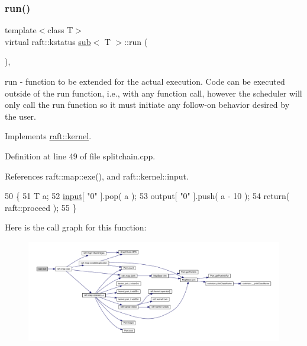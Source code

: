 \subsubsection{\texorpdfstring{run()}{run()}\hspace{0.1cm}{\footnotesize\ttfamily [10/12]}}
{\footnotesize\ttfamily template$<$class T$>$ \\
virtual raft\+::kstatus \hyperlink{classsub}{sub}$<$ T $>$\+::run (\begin{DoxyParamCaption}{ }\end{DoxyParamCaption})\hspace{0.3cm}{\ttfamily [inline]}, {\ttfamily [virtual]}}

run -\/ function to be extended for the actual execution. Code can be executed outside of the run function, i.\+e., with any function call, however the scheduler will only call the run function so it must initiate any follow-\/on behavior desired by the user. 

Implements \hyperlink{classraft_1_1kernel_a05094286d7577360fb1b91c91fc05901}{raft\+::kernel}.



Definition at line 49 of file splitchain.\+cpp.



References raft\+::map\+::exe(), and raft\+::kernel\+::input.


\begin{DoxyCode}
50     \{
51         T a;
52         \hyperlink{classraft_1_1kernel_a6edbe35a56409d402e719b3ac36d6554}{input}[ \textcolor{stringliteral}{"0"} ].pop( a );
53         output[ \textcolor{stringliteral}{"0"} ].push( a - 10 );
54         \textcolor{keywordflow}{return}( raft::proceed );
55     \}
\end{DoxyCode}
Here is the call graph for this function\+:
\nopagebreak
\begin{figure}[H]
\begin{center}
\leavevmode
\includegraphics[width=350pt]{classsub_a0a0c7461433ee8b5f4b24305282bf69a_cgraph}
\end{center}
\end{figure}
\hypertarget{classsub_a0a0c7461433ee8b5f4b24305282bf69a}{}\label{classsub_a0a0c7461433ee8b5f4b24305282bf69a} 
